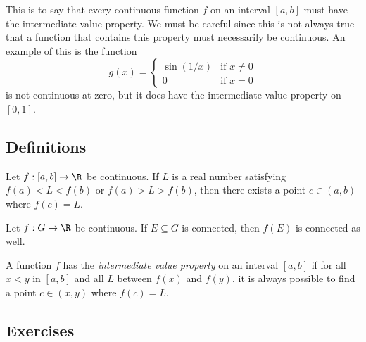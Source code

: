 This is to say that every continuous function \( f \) on an interval \( [a,b] \) must have the intermediate value property. We must be careful since this is not always true that a function that contains this property must necessarily be continuous. An example of this is the function 
\[  g(x) = 
\begin{cases}
    \sin(1/x) &\text{if } x \neq 0 \\
    0 &\text{if } x = 0
\end{cases}  \]
is not continuous at zero, but it does have the intermediate value property on \( [0,1] \). 


\subsection{Definitions}


\begin{tcolorbox}
    \begin{thm}
    Let \( f: [a,b] \to \R  \) be continuous. If \( L  \) is a real number satisfying \( f(a) < L < f(b) \) or \( f(a) > L > f(b) \), then there exists a point \( c \in (a,b) \) where \( f(c) = L  \).
    \end{thm}
\end{tcolorbox}


\begin{tcolorbox}
    \begin{thm}
    Let \( f: G \to \R  \) be continuous. If \( E \subseteq G  \) is connected, then \( f(E) \) is connected as well.
    \end{thm}
\end{tcolorbox}


\begin{tcolorbox}
\begin{defn}
    A function \( f  \) has the \textit{intermediate value property} on an interval \( [a,b] \) if for all \( x < y  \) in \( [a,b] \) and all \( L   \) between \( f(x)  \) and \( f(y) \), it is always possible to find a point \( c \in (x,y) \) where \( f(c) = L  \).
\end{defn}
\end{tcolorbox}

\subsection{Exercises}

